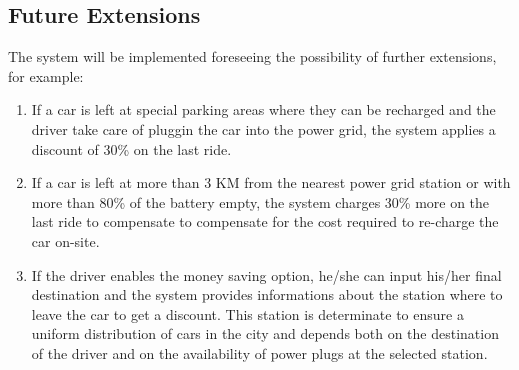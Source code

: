 \subsection{Future Extensions}
The system will be implemented foreseeing the possibility of further extensions, for example:

\begin{enumerate}
	\item If a car is left at special parking areas where they can be recharged and the driver take care of pluggin the car into the power grid, the system applies a discount of 30\% on the last ride.
	\item If a car is left at more than 3 KM from the nearest power grid station or with more than 80\% of the battery empty, the system charges 30\% more on the last ride to compensate to compensate for the cost required to re-charge the car on-site.
	\item If the driver enables the money saving option, he/she can input his/her final destination and the system provides informations about the station where to leave the car to get a discount. This station is determinate to ensure a uniform distribution of cars in the city and depends both on the destination of the driver and on the availability of power plugs at the selected station.
\end{enumerate}